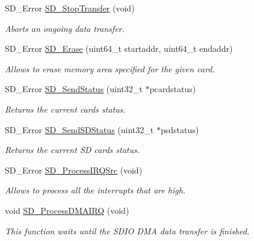 \begin{DoxyCompactItemize}
S\+D\+\_\+\+Error \hyperlink{group___s_t_m324x_g___e_v_a_l___s_d_i_o___s_d___exported___functions_gad3dc52f076ae8145e105cb4d8a37b043}{S\+D\+\_\+\+Stop\+Transfer} (void)
\begin{DoxyCompactList}\small\item\em Aborts an ongoing data transfer. \end{DoxyCompactList}\item 
S\+D\+\_\+\+Error \hyperlink{group___s_t_m324x_g___e_v_a_l___s_d_i_o___s_d___exported___functions_gaca2450c63f52cd6c1d50f6de33ecfdf8}{S\+D\+\_\+\+Erase} (uint64\+\_\+t startaddr, uint64\+\_\+t endaddr)
\begin{DoxyCompactList}\small\item\em Allows to erase memory area specified for the given card. \end{DoxyCompactList}\item 
S\+D\+\_\+\+Error \hyperlink{group___s_t_m324x_g___e_v_a_l___s_d_i_o___s_d___exported___functions_ga7de24baeb4c6a7c9e5668630b8797888}{S\+D\+\_\+\+Send\+Status} (uint32\+\_\+t $\ast$pcardstatus)
\begin{DoxyCompactList}\small\item\em Returns the current card\textquotesingle{}s status. \end{DoxyCompactList}\item 
S\+D\+\_\+\+Error \hyperlink{group___s_t_m324x_g___e_v_a_l___s_d_i_o___s_d___exported___functions_gab573516bdaa3054877172415e66d0e57}{S\+D\+\_\+\+Send\+S\+D\+Status} (uint32\+\_\+t $\ast$psdstatus)
\begin{DoxyCompactList}\small\item\em Returns the current SD card\textquotesingle{}s status. \end{DoxyCompactList}\item 
S\+D\+\_\+\+Error \hyperlink{group___s_t_m324x_g___e_v_a_l___s_d_i_o___s_d___exported___functions_gab21b0412e865d8cabc915dc840fa1ccc}{S\+D\+\_\+\+Process\+I\+R\+Q\+Src} (void)
\begin{DoxyCompactList}\small\item\em Allows to process all the interrupts that are high. \end{DoxyCompactList}\item 
void \hyperlink{group___s_t_m324x_g___e_v_a_l___s_d_i_o___s_d___exported___functions_ga52ec18498c19918549142f6680a7b21e}{S\+D\+\_\+\+Process\+D\+M\+A\+I\+RQ} (void)
\begin{DoxyCompactList}\small\item\em This function waits until the S\+D\+IO D\+MA data transfer is finished. \end{DoxyCompactList}\item 

\end{DoxyCompactItemize}
